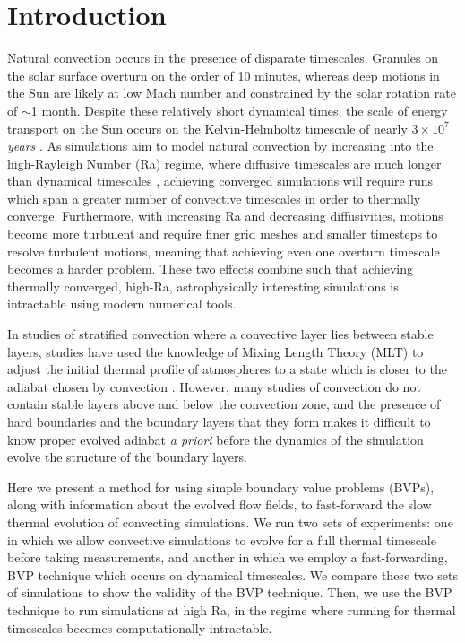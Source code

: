 \documentclass[aps, pre, onecolumn, nofootinbib, notitlepage, groupedaddress, amsfonts, amssymb, amsmath, longbibliography]{revtex4-1}
\begin{document}
\section{Introduction}
\label{sec:intro}
Natural convection occurs in the presence of disparate timescales. Granules on the
solar surface overturn on the order of 10 minutes, whereas deep motions in the Sun are likely at
low Mach number and constrained by the solar rotation rate of $\sim$1 month.  
Despite these relatively short dynamical times, the scale of energy transport on the
Sun occurs on the Kelvin-Helmholtz timescale of nearly $3 \times 10^7$ \emph{years} \cite{stix2003}. 
As simulations aim to model natural convection
by increasing into the high-Rayleigh Number (Ra) regime, where diffusive timescales are much
longer than dynamical timescales \cite{Anders&Brown2017}, achieving converged simulations will 
require runs which span a greater number of convective timescales in order to thermally converge.
Furthermore, with increasing Ra and decreasing diffusivities, motions become more turbulent
and require finer grid meshes and smaller timesteps to resolve turbulent motions, meaning that
achieving even one overturn timescale becomes a harder problem.  
These two effects combine such that achieving thermally converged, high-Ra, astrophysically interesting
simulations is intractable using modern numerical tools.

In studies of stratified convection where a convective layer lies between stable layers, studies
have used the knowledge of Mixing Length Theory (MLT) to adjust the initial thermal profile of
atmospheres to a state which is closer to the adiabat chosen by convection \cite{brandenburg&all2005}.
However, many studies of convection do not contain stable layers above and below the convection
zone, and the presence of hard boundaries and the boundary layers that they form makes it difficult to
know proper evolved adiabat \emph{a priori} before the dynamics of the simulation evolve the
structure of the boundary layers.

Here we present a method for using simple boundary value problems (BVPs), 
along with information about the evolved flow fields,
to fast-forward the slow thermal evolution of convecting simulations.  
We run two sets of experiments: one in which we allow convective simulations to evolve for a
full thermal timescale before taking measurements, and another in which we employ a fast-forwarding,
BVP technique which occurs on dynamical timescales. We compare these two sets of simulations to
show the validity of the BVP technique.  Then, we use the BVP technique to run simulations
at high Ra, in the regime where running for thermal timescales becomes computationally intractable.
\end{document}
